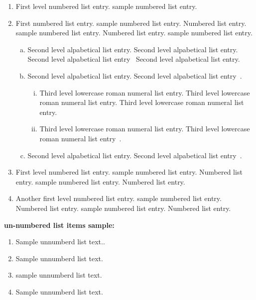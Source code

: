 \documentclass[AMS,STIX2COL]{WileyNJD-v2}
\begin{document}
    \begin{enumerate}[1.]
        \item First level numbered list entry. sample numbered list entry.

        \item First numbered list entry. sample numbered list entry. Numbered list entry. sample numbered list entry. Numbered list entry. sample numbered list entry.

        \begin{enumerate}[a.]
            \item Second level alpabetical list entry. Second level alpabetical list entry. Second level alpabetical list entry~\citet{Allen2011} Second level alpabetical list entry.

            \item Second level alpabetical list entry. Second level alpabetical list entry~\citet{Schulz2012,Allen2011,Ballen2011}.

            \begin{enumerate}[ii.]
                \item Third level lowercase roman numeral list entry. Third level lowercase roman numeral list entry. Third level lowercase roman numeral list entry.

                \item Third level lowercase roman numeral list entry. Third level lowercase roman numeral list entry~\cite{Yoo2007}.
            \end{enumerate}

            \item Second level alpabetical list entry. Second level alpabetical list entry~\cite{Elbaum2002}.
        \end{enumerate}

        \item First level numbered list entry. sample numbered list entry. Numbered list entry. sample numbered list entry. Numbered list entry.

        \item Another first level numbered list entry. sample numbered list entry. Numbered list entry. sample numbered list entry. Numbered list entry.
    \end{enumerate}

    \noindent\textbf{un-numbered list items sample:}

    \begin{enumerate}[]
        \item Sample unnumberd list text..
        \item Sample unnumberd list text.
        \item sample unnumberd list text.
        \item Sample unnumberd list text.
    \end{enumerate}
\end{document}
